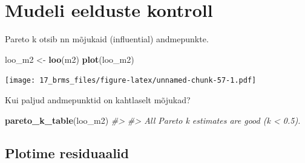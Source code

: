 \documentclass[]{book}
\newenvironment{Shaded}{\begin{snugshade}}{\end{snugshade}}
\newcommand{\KeywordTok}[1]{\textcolor[rgb]{0.13,0.29,0.53}{\textbf{#1}}}
\newcommand{\DataTypeTok}[1]{\textcolor[rgb]{0.13,0.29,0.53}{#1}}
\newcommand{\DecValTok}[1]{\textcolor[rgb]{0.00,0.00,0.81}{#1}}
\newcommand{\StringTok}[1]{\textcolor[rgb]{0.31,0.60,0.02}{#1}}
\newcommand{\CommentTok}[1]{\textcolor[rgb]{0.56,0.35,0.01}{\textit{#1}}}
\newcommand{\OperatorTok}[1]{\textcolor[rgb]{0.81,0.36,0.00}{\textbf{#1}}}
\newcommand{\NormalTok}[1]{#1}
\begin{document}
\begin{Shaded}
\end{Shaded}

\section{Mudeli eelduste kontroll}\label{mudeli-eelduste-kontroll}

Pareto k otsib nn mõjukaid (influential) andmepunkte.

\begin{Shaded}
\begin{Highlighting}[]
\NormalTok{loo_m2 <-}\StringTok{ }\KeywordTok{loo}\NormalTok{(m2)}
\KeywordTok{plot}\NormalTok{(loo_m2)}
\end{Highlighting}
\end{Shaded}

\texttt{[image: 17\_brms\_files/figure-latex/unnamed-chunk-57-1.pdf]}

Kui paljud andmepunktid on kahtlaselt mõjukad?

\begin{Shaded}
\begin{Highlighting}[]
\KeywordTok{pareto_k_table}\NormalTok{(loo_m2) }
\CommentTok{#> }
\CommentTok{#> All Pareto k estimates are good (k < 0.5).}
\end{Highlighting}
\end{Shaded}

\subsection{Plotime residuaalid}\label{plotime-residuaalid}
\end{document}
